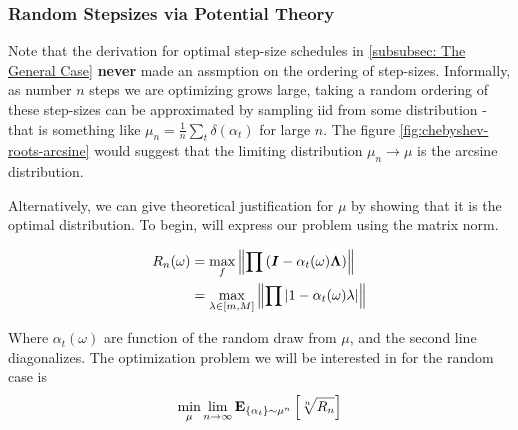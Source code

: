 \documentclass[11pt]{article}
\begin{document}
\subsubsection{Random Stepsizes via Potential Theory}

Note that the derivation for optimal step-size schedules in \ref{subsubsec: The General Case} \textbf{never} made an assmption on the ordering of step-sizes. Informally,
as number $n$ steps we are optimizing grows large, taking a random ordering of these step-sizes can be approximated by sampling iid from some distribution - that is something like  $\mu_n = \frac{1}{n}\sum_t\delta(\alpha_t)$ for large $n$. The figure \ref{fig:chebyshev-roots-arcsine} would suggest that the limiting distribution $\mu_n \rightarrow \mu$ is the arcsine distribution.

Alternatively, we can give theoretical justification for $\mu$ by showing that it is the optimal distribution. To begin, will express our problem using the matrix norm.

\begin{align*}
    R_n(\omega) &= \max_{f} \left\| \prod{\left(\ensuremath{\bm{I}}-\alpha_t(\omega) \ensuremath{\bm{\Lambda}}\right)} \right\| \\
    &= \max_{\lambda\in[m,M]} \left\| \prod{\ensuremath{{\left\vert 1- \alpha_t(\omega)\lambda \right\vert}}} \right\|
\end{align*}

Where $\alpha_t(\omega)$ are function of the random draw from $\mu$, and the second line diagonalizes.
The optimization problem we will be interested in for the random case is 
\[\min_\mu \lim_{n\to\infty} \textbf{E}_{\{\alpha_t\}\sim\mu^n} \left[\sqrt[n]{R_n}\right]\]




\end{document}
